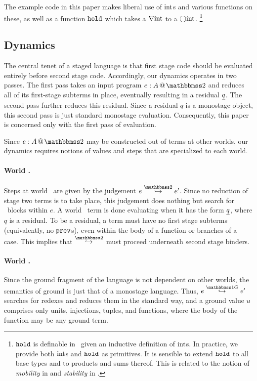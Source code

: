 \begin{abstrsyn}
The example code in this paper makes liberal use of ${\rm int}$s and various
functions on these, as well as a function ${\tt hold}$ which takes a $\nabla{\rm int}$
to a $\bigcirc{\rm int}$.%
\footnote{${\tt hold}$ is definable in \lang\ given an inductive definition of
${\rm int}$s. In practice, we provide both ${\rm int}$s and ${\tt hold}$ as primitives.
It is sensible to extend ${\tt hold}$ to all base types and to products and sums
thereof. This is related to the notion of {\em mobility} in \cite{murphy05} and
{\em stability} in \cite{krishnaswami13}.}

\end{abstrsyn}


\subsection{Dynamics}
\label{sec:dynamics}




The central tenet of a staged language
is that first stage code should be evaluated entirely before second stage code.
Accordingly, our dynamics operates in two passes.
The first pass takes an input program $\coltwo e A$
and reduces all of its first-stage subterms in place,
eventually resulting in a residual $\underline{q}$.
The second pass further reduces this residual.
Since a residual $q$ is a monostage object, this second pass is just standard monostage evaluation.
Consequently, this paper is concerned only with the first pass of evaluation.

Since $\coltwo e A$ may be constructed out of terms at other worlds, 
our dynamics requires notions of values and steps that are specialized to each world.

\paragraph{World \bbtwo.} Steps at world \bbtwo\ are given by the judgement \mbox{$\steptwo e {e'}$}.
Since no reduction of stage two terms is to take place, this judgement does nothing but search for \prev\ blocks within $e$.
A world \bbtwo\ term is done evaluating when it has the form $\underline{q}$, where $q$ is a residual. 
To be a residual, a term must have no first stage subterms (equivalently, no ${\tt prev}$s), even within the body of a function or branches of a case.
This implies that $\stepsym \bbtwo$ must proceed underneath second stage binders.

\paragraph{World \bbonep.} Since the ground fragment of the language is not dependent on other worlds, the semantics of ground is just that of a monostage language.
Thus, $\steppure e {e'}$ searches for redexes and reduces them in the standard way, and a ground value $u$ comprises only units, injections, tuples, and functions, where the body of the function may be any ground term.


